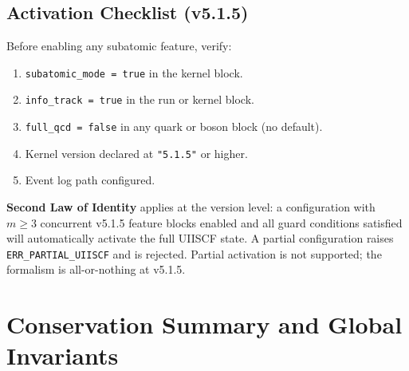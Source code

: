 \documentclass[11pt,a4paper]{article}
\begin{document}
\subsection{Activation Checklist (v5.1.5)}

Before enabling any subatomic feature, verify:
\begin{enumerate}[leftmargin=1.5em]
  \item \texttt{subatomic\_mode = true} in the kernel block.
  \item \texttt{info\_track = true} in the run or kernel block.
  \item \texttt{full\_qcd = false} in any quark or boson block (no default).
  \item Kernel version declared at \texttt{"5.1.5"} or higher.
  \item Event log path configured.
\end{enumerate}

\begin{smlaw}
\textbf{Second Law of Identity} applies at the version level: a configuration
with $m \geq 3$ concurrent v5.1.5 feature blocks enabled and all guard
conditions satisfied will automatically activate the full UIISCF state.
A partial configuration raises \texttt{ERR\_PARTIAL\_UIISCF} and is rejected.
Partial activation is not supported; the formalism is all-or-nothing at v5.1.5.
\end{smlaw}

\section{Conservation Summary and Global Invariants}\label{sec:conservation}
\end{document}
